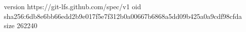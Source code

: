 version https://git-lfs.github.com/spec/v1
oid sha256:6db8e6bb66edd2b9e017f5e7f312b0a00667b6868a5dd09b425a0a9cdf98cfda
size 262240
